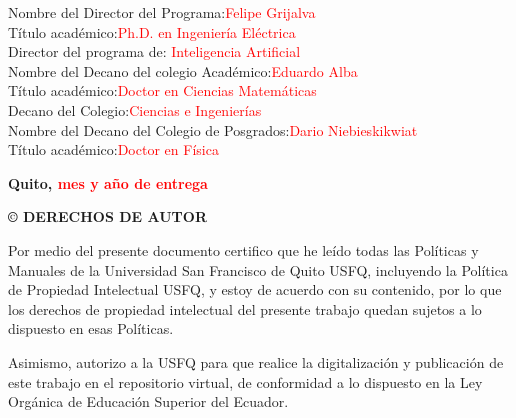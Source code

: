 \IfFileExists{IEEEtran.cls}{\documentclass[journal]{IEEEtran}}{\documentclass[twocolumn]{article}}
\newenvironment{customfontsize}{
    \fontsize{12}{14}\selectfont
}{}
\begin{document}
\begin{customfontsize}
Nombre del Director del Programa:\hspace{3cm}\textcolor{red} {Felipe Grijalva}\\
Título académico:\hspace{6.2cm}\textcolor{red}{Ph.D. en Ingeniería Eléctrica}\\
Director del programa de:\hspace{4.7cm}\textcolor{red}{ Inteligencia Artificial}
\vspace{30pt}
\\Nombre del Decano del colegio Académico:\hspace{1.6cm}\textcolor{red}{Eduardo Alba}\\ 
Título académico:\hspace{6.2cm}\textcolor{red}{Doctor en Ciencias Matemáticas}\\
Decano del Colegio:\hspace{5.8cm}\textcolor{red}{Ciencias e Ingenierías}
\vspace{30pt}
\\Nombre del Decano del Colegio de Posgrados:\hspace{1cm}\textcolor{red}{Dario Niebieskikwiat}\\
Título académico:\hspace{6.1cm}\textcolor{red}{Doctor en Física}

\end{customfontsize}

\begin{center}
\vspace{180pt}
\textbf{\fontsize{14}{16}\selectfont Quito, \textcolor{red}{mes y año de entrega}}
\end{center}

\newpage
\begin{center}
\textbf{\fontsize{14}{16}\selectfont © DERECHOS DE AUTOR}\\
\vspace{10pt}
\end{center}


\fontsize{12}{14}\selectfont
{
\setlength{\parindent}{3em}
\hspace{1pt}

Por medio del presente documento certifico que he leído todas las Políticas y Manuales de la Universidad San Francisco de Quito USFQ, incluyendo la Política de Propiedad Intelectual USFQ, y estoy de acuerdo con su contenido, por lo que los derechos de propiedad intelectual del presente trabajo quedan sujetos a lo dispuesto en esas Políticas.

Asimismo, autorizo a la USFQ para que realice la digitalización y publicación de este trabajo en el repositorio virtual, de conformidad a lo dispuesto en la Ley Orgánica de Educación Superior del Ecuador.
}
\end{document}
